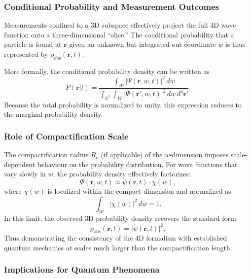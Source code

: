 \documentclass[12pt]{article}
\begin{document}
\subsubsection*{Conditional Probability and Measurement Outcomes}

Measurements confined to a 3D subspace effectively project the full 4D wave function onto a three-dimensional “slice.” The conditional probability that a particle is found at \(\mathbf{r}\) given an unknown but integrated-out coordinate \(w\) is thus represented by \(\rho_{\text{obs}}(\mathbf{r}, t)\).

More formally, the conditional probability density can be written as
\begin{equation}
    P(\mathbf{r} | t) = \frac{\int_{\mathcal{W}} |\Psi(\mathbf{r}, w, t)|^2 \, dw}{\int_{\mathbb{R}^3} \int_{\mathcal{W}} |\Psi(\mathbf{r}', w, t)|^2 \, dw \, d^3 \mathbf{r}'}.
\end{equation}
Because the total probability is normalized to unity, this expression reduces to the marginal probability density.

\subsubsection*{Role of Compactification Scale}

The compactification radius \(R_c\) (if applicable) of the \(w\)-dimension imposes scale-dependent behaviour on the probability distribution. For wave functions that vary slowly in \(w\), the probability density effectively factorizes:
\begin{equation}
    \Psi(\mathbf{r}, w, t) \approx \psi(\mathbf{r}, t) \cdot \chi(w),
\end{equation}
where \(\chi(w)\) is localized within the compact dimension and normalized as
\begin{equation}
    \int_{\mathcal{W}} |\chi(w)|^2 \, dw = 1.
\end{equation}
In this limit, the observed 3D probability density recovers the standard form:
\begin{equation}
    \rho_{\text{obs}}(\mathbf{r}, t) = |\psi(\mathbf{r}, t)|^2,
\end{equation}
Thus demonstrating the consistency of the 4D formalism with established quantum mechanics at scales much larger than the compactification length.

\subsubsection*{Implications for Quantum Phenomena}
\end{document}
